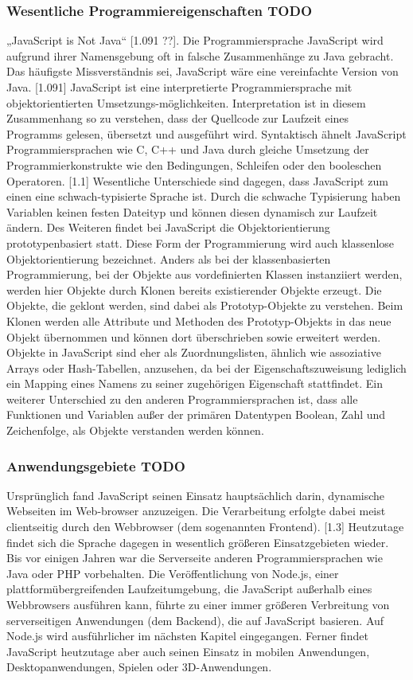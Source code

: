 \subsubsection{Wesentliche Programmiereigenschaften TODO}
„JavaScript is Not Java“ [1.091 ??]. Die Programmiersprache JavaScript wird aufgrund ihrer Namensgebung oft in falsche Zusammenhänge zu Java gebracht. Das häufigste Missverständnis sei, JavaScript wäre eine vereinfachte Version von Java. [1.091]
JavaScript ist eine interpretierte Programmiersprache mit objektorientierten Umsetzungs-möglichkeiten. Interpretation ist in diesem Zusammenhang so zu verstehen, dass der Quellcode zur Laufzeit eines Programms gelesen, übersetzt und ausgeführt wird.
Syntaktisch ähnelt JavaScript Programmiersprachen wie C, C++ und Java durch gleiche Umsetzung der Programmierkonstrukte wie den Bedingungen, Schleifen oder den booleschen Operatoren. [1.1] Wesentliche Unterschiede sind dagegen, dass JavaScript zum einen eine schwach-typisierte Sprache ist. Durch die schwache Typisierung haben Variablen keinen festen Dateityp und können diesen dynamisch zur Laufzeit ändern. Des Weiteren findet bei JavaScript die Objektorientierung prototypenbasiert statt. Diese Form der Programmierung wird auch klassenlose Objektorientierung bezeichnet. Anders als bei der klassenbasierten Programmierung, bei der Objekte aus vordefinierten Klassen instanziiert werden, werden hier Objekte durch Klonen bereits existierender Objekte erzeugt. Die Objekte, die geklont werden, sind dabei als Prototyp-Objekte zu verstehen. Beim Klonen werden alle Attribute und Methoden des Prototyp-Objekts in das neue Objekt übernommen und können dort überschrieben sowie erweitert werden. Objekte in JavaScript sind eher als Zuordnungslisten, ähnlich wie assoziative Arrays oder Hash-Tabellen, anzusehen, da bei der Eigenschaftszuweisung lediglich ein Mapping eines Namens zu seiner zugehörigen Eigenschaft stattfindet. Ein weiterer Unterschied zu den anderen Programmiersprachen ist, dass alle Funktionen und Variablen außer der primären Datentypen Boolean, Zahl und Zeichenfolge, als Objekte verstanden werden können.

\subsubsection{Anwendungsgebiete TODO}
Ursprünglich fand JavaScript seinen Einsatz hauptsächlich darin, dynamische Webseiten im Web-browser anzuzeigen. Die Verarbeitung erfolgte dabei meist clientseitig durch den Webbrowser (dem sogenannten Frontend). [1.3] 
Heutzutage findet sich die Sprache dagegen in wesentlich größeren Einsatzgebieten wieder. 
Bis vor einigen Jahren war die Serverseite anderen Programmiersprachen wie Java oder PHP vorbehalten. Die Veröffentlichung von Node.js, einer plattformübergreifenden Laufzeitumgebung, die JavaScript außerhalb eines Webbrowsers ausführen kann, führte zu einer immer größeren Verbreitung von serverseitigen Anwendungen (dem Backend), die auf JavaScript basieren. Auf Node.js wird ausführlicher im nächsten Kapitel eingegangen. 
Ferner findet JavaScript heutzutage aber auch seinen Einsatz in mobilen Anwendungen, Desktopanwendungen, Spielen oder 3D-Anwendungen.

